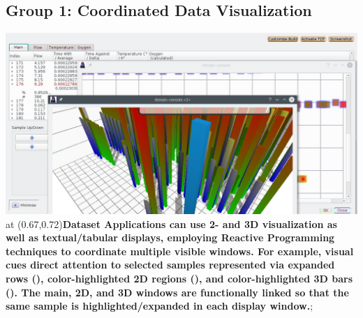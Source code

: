 
\begin{frame}{}
\section{Group 1: Coordinated Data Visualization}

	\pdfpageheight 30cm
	
\begin{annotatedFigure}{2mm}{-1mm}{\includegraphics[scale=1]{texs/coord.png}}
  \node [anchor=west,inner sep=14, text width=8.7cm,
  line width=1mm, fill opacity=0.9,
  draw = blue!20!black,
  top color=white,text=black,
  bottom color=blue!40,
  rounded corners=6pt
  ]
  at (0.67,0.72){\annfont\textbf{Dataset Applications can use 2- and 3D 
  		visualization as well as textual/tabular displays, employing Reactive 
  		Programming techniques to coordinate multiple visible windows.  For example, 
  		visual cues direct attention to selected samples represented via 
  		expanded rows (), color-highlighted 2D regions (), 
  		and color-highlighted 3D bars ().  The main, 2D, 
  		and 3D windows are functionally linked so that the same sample is 
  		highlighted/expanded in each display window.}};
  
              
\end{annotatedFigure}	
\end{frame}

